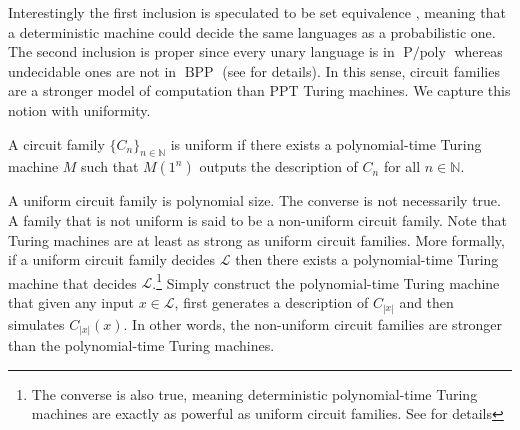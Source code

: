 Interestingly the first inclusion is speculated to be set equivalence \cite[pp. 126]{Arora}, meaning that a deterministic machine could decide the same languages as a probabilistic one. The second inclusion is proper since every unary language is in $\operatorname{P/poly}$ whereas undecidable ones are not in $\operatorname{BPP}$ (see \cite[pp. 110]{Arora} for details). In this sense, circuit families are a stronger model of computation than PPT Turing machines. We capture this notion with uniformity. 

\begin{definition}
A circuit family $\{C_n\}_{n \in \mathbb{N}}$ is uniform if there exists a polynomial-time Turing machine $M$ such that $M(1^n)$ outputs the description of $C_n$ for all $n\in \mathbb{N}$.
\end{definition}

A uniform circuit family is polynomial size. The converse is not necessarily true. A family that is not uniform is said to be a non-uniform circuit family. Note that Turing machines are at least as strong as uniform circuit families. More formally, if a uniform circuit family decides $\mathscr{L}$ then there exists a polynomial-time Turing machine that decides $\mathscr{L}$.\footnote{The converse is also true, meaning deterministic polynomial-time Turing machines are exactly as powerful as uniform circuit families. See \cite[pp. 111]{Arora} for details} Simply construct the polynomial-time Turing machine that given any input $x \in \mathscr{L}$, first generates a description of $C_{|x|}$ and then simulates $C_{|x|}(x)$. In other words, the non-uniform circuit families are stronger than the polynomial-time Turing machines.

